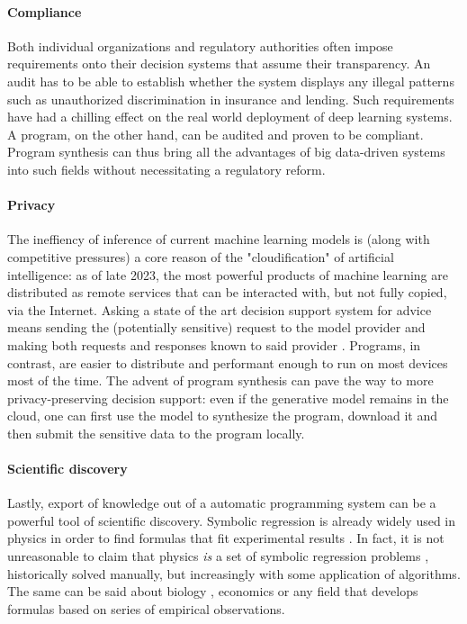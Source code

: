 \paragraph{Compliance}

Both individual organizations and regulatory authorities often impose requirements onto their decision systems that assume their transparency. 
An audit has to be able to establish whether the system displays any illegal patterns such as unauthorized discrimination in insurance and lending. 
Such requirements have had a chilling effect on the real world deployment of deep learning systems. 
A program, on the other hand, can be audited and proven to be compliant. 
Program synthesis can thus bring all the advantages of big data-driven systems into such fields without necessitating a regulatory reform.

\paragraph{Privacy}

The ineffiency of inference of current machine learning models is (along with competitive pressures) a core reason of the "cloudification" of artificial intelligence: as of late 2023, the most powerful products of machine learning \cite{achiamGpt4TechnicalReport2023} are distributed as remote services that can be interacted with, but not fully copied, via the Internet.
Asking a state of the art decision support system for advice means sending the (potentially sensitive) request to the model provider and making both requests and responses known to said provider \cite{PrivacyPolicy}.
Programs, in contrast, are easier to distribute and performant enough to run on most devices most of the time.
The advent of program synthesis can pave the way to more privacy-preserving decision support: even if the generative model remains in the cloud, one can first use the model to synthesize the program, download it and then submit the sensitive data to the program locally.


\paragraph{Scientific discovery}

Lastly, export of knowledge out of a automatic programming system can be a powerful tool of scientific discovery. 
Symbolic regression is already widely used in physics in order to find formulas that fit experimental results \cite{angelisArtificialIntelligencePhysical2023, tenachiDeepSymbolicRegression2023}. 
In fact, it is not unreasonable to claim that physics \emph{is} a set of symbolic regression problems \cite{udrescuAIFeynmanPhysicsinspired2020}, historically solved manually, but increasingly with some application of algorithms. 
The same can be said about biology \cite{chenRevealingComplexEcological2019}, economics \cite{claveriaAssessmentEffectFinancial2017, lianModelingForecastingPassenger2018, panInfluentialFactorsCarbon2019, truscottDetectingShadowEconomy2011, truscottExplainingUnemploymentRates2014, yamashitaCustomizedPredictionAttendance2022} or any field that develops formulas based on series of empirical observations.
